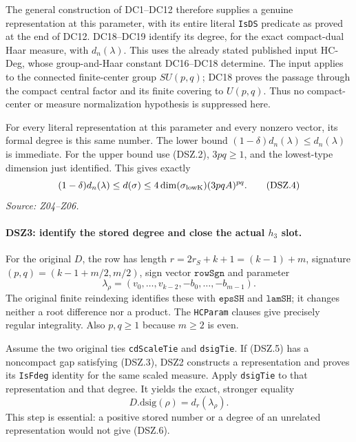 The general construction of DC1--DC12 therefore supplies a genuine
representation at this parameter, with its entire literal
\texttt{IsDS} predicate as proved at the end of DC12.
DC18--DC19 identify its degree, for the exact compact-dual Haar
measure, with $d_n(\lambda)$. This uses the already stated published
input HC-Deg, whose group-and-Haar constant DC16--DC18 determine.
The input applies to the connected finite-center group $SU(p,q)$;
DC18 proves the passage through the compact central factor and its
finite covering to $U(p,q)$. Thus no compact-center or measure
normalization hypothesis is suppressed here.

For every literal representation at this parameter and every nonzero
vector, its formal degree is this same number. The lower bound
$(1-\delta)d_n(\lambda)\le d_n(\lambda)$ is immediate. For the upper
bound use (DSZ.2), $3pq\ge1$, and the lowest-type dimension just
identified. This gives exactly
\[
 (1-\delta)d_n(\lambda)\le d(\sigma)
 \le4\dim(\sigma_{\rm lowK})(3pqA)^{pq}.                       \tag{DSZ.4}
\]
\emph{Source: Z04--Z06.}

\paragraph{DSZ3: identify the stored degree and close the actual $h_3$ slot.}
\label{claim:DSZ3}
For the original $D$, the row has length
$r=2r_S+k+1=(k-1)+m$, signature
$(p,q)=(k-1+m/2,m/2)$, sign vector
$\texttt{rowSgn}$ and parameter
\[
 \lambda_\rho=(v_0,\ldots,v_{k-2},-b_0,\ldots,-b_{m-1}).
                                                               \tag{DSZ.5}
\]
The original finite reindexing identifies these with
$\texttt{epsSH}$ and $\texttt{lamSH}$; it changes neither a root
difference nor a product. The \texttt{HCParam} clauses give precisely
regular integrality. Also $p,q\ge1$ because $m\ge2$ is even.

Assume the two original ties \texttt{cdScaleTie} and
\texttt{dsigTie}. If (DSZ.5) has a noncompact gap satisfying
(DSZ.3), DSZ2 constructs a representation and proves its
\texttt{IsFdeg} identity for the same scaled measure. Apply
\texttt{dsigTie} to that representation and that degree. It yields
the exact, stronger equality
\[
                    D.\mathrm{dsig}(\rho)=d_r(\lambda_\rho).
                                                               \tag{DSZ.6}
\]
This step is essential: a positive stored number or a degree of an
unrelated representation would not give (DSZ.6).

